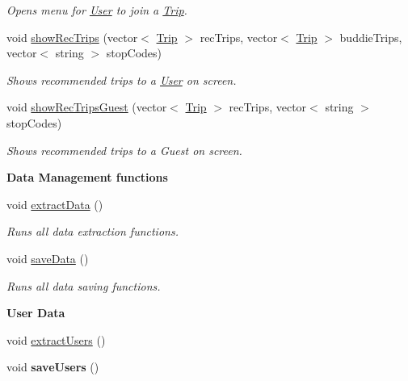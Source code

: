 \begin{Indent}
\begin{DoxyCompactItemize}
\begin{DoxyCompactList}\small\item\em Opens menu for \hyperlink{class_user}{User} to join a \hyperlink{class_trip}{Trip}. \end{DoxyCompactList}\item 
void \hyperlink{group___agency_gabc352c6cad4e22817e2a52a0e756e295}{show\+Rec\+Trips} (vector$<$ \hyperlink{class_trip}{Trip} $>$ rec\+Trips, vector$<$ \hyperlink{class_trip}{Trip} $>$ buddie\+Trips, vector$<$ string $>$ stop\+Codes)
\begin{DoxyCompactList}\small\item\em Shows recommended trips to a \hyperlink{class_user}{User} on screen. \end{DoxyCompactList}\item 
void \hyperlink{group___agency_ga7cde2e6cef7a7e4dbcb84af39a8caa34}{show\+Rec\+Trips\+Guest} (vector$<$ \hyperlink{class_trip}{Trip} $>$ rec\+Trips, vector$<$ string $>$ stop\+Codes)
\begin{DoxyCompactList}\small\item\em Shows recommended trips to a Guest on screen. \end{DoxyCompactList}\end{DoxyCompactItemize}
\end{Indent}
\begin{Indent}\textbf{ Data Management functions}\par
\begin{DoxyCompactItemize}
\item 
void \hyperlink{group___agency_ga20bc20b90914b5e446b683dcd7f6d0ef}{extract\+Data} ()
\begin{DoxyCompactList}\small\item\em Runs all data extraction functions. \end{DoxyCompactList}\item 
void \hyperlink{group___agency_ga67c29f4711b1596630ae970e6a9027ac}{save\+Data} ()
\begin{DoxyCompactList}\small\item\em Runs all data saving functions. \end{DoxyCompactList}\end{DoxyCompactItemize}
\end{Indent}
\begin{Indent}\textbf{ User Data}\par
\begin{DoxyCompactItemize}
\item 
void \hyperlink{group___agency_ga659e4c6df03779b524f37b1c8fb5221d}{extract\+Users} ()
\item 
void {\bfseries save\+Users} ()
\end{DoxyCompactItemize}
\end{Indent}
